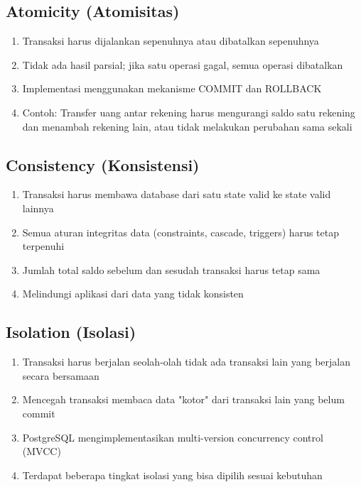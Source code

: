 \subsection{Atomicity (Atomisitas)}
\begin{enumerate}
    \item Transaksi harus dijalankan sepenuhnya atau dibatalkan sepenuhnya
    \item Tidak ada hasil parsial; jika satu operasi gagal, semua operasi dibatalkan
    \item Implementasi menggunakan mekanisme COMMIT dan ROLLBACK
    \item Contoh: Transfer uang antar rekening harus mengurangi saldo satu rekening dan menambah rekening lain, atau tidak melakukan perubahan sama sekali
\end{enumerate}

\subsection{Consistency (Konsistensi)}
\begin{enumerate}
    \item Transaksi harus membawa database dari satu state valid ke state valid lainnya
    \item Semua aturan integritas data (constraints, cascade, triggers) harus tetap terpenuhi
    \item Jumlah total saldo sebelum dan sesudah transaksi harus tetap sama
    \item Melindungi aplikasi dari data yang tidak konsisten
\end{enumerate}

\subsection{Isolation (Isolasi)}
\begin{enumerate}
    \item Transaksi harus berjalan seolah-olah tidak ada transaksi lain yang berjalan secara bersamaan
    \item Mencegah transaksi membaca data "kotor" dari transaksi lain yang belum commit
    \item PostgreSQL mengimplementasikan multi-version concurrency control (MVCC)
    \item Terdapat beberapa tingkat isolasi yang bisa dipilih sesuai kebutuhan
\end{enumerate}


